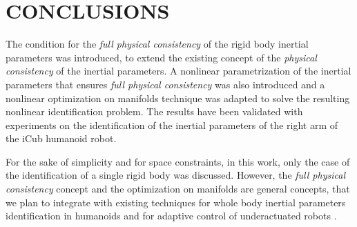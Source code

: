 \section{CONCLUSIONS}
The condition for the \emph{full physical consistency} of the rigid body inertial parameters was introduced, to extend the existing concept of the \emph{physical consistency} of the inertial parameters. A nonlinear parametrization of the inertial parameters that ensures \emph{full physical consistency} was also introduced and a nonlinear optimization on manifolds technique was adapted to solve the resulting nonlinear identification problem. The results have been validated with experiments on the identification of the inertial parameters of the right arm of the iCub humanoid robot.

For the sake of simplicity and for space constraints, in this work, only the case of the identification of a single rigid body was discussed. However, the \emph{full physical consistency} concept and the optimization on manifolds are general concepts, that we plan to integrate with existing techniques for whole body inertial parameters identification in humanoids \cite{ayusawa2014identifiability,jovic2015identification} and for adaptive control of underactuated robots \cite{pucci2015collocated}.